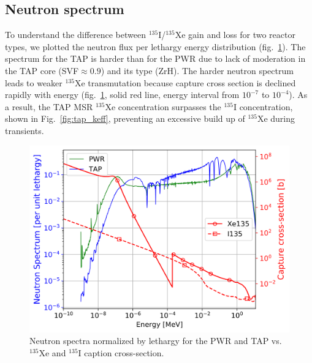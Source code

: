 \documentclass{anstrans}
\begin{document}
\subsection{Neutron spectrum}
To understand the  difference between $^{135}$I/$^{135}$Xe gain and loss for 
two reactor types, we plotted the neutron flux per lethargy energy 
distribution (fig.~\ref{fig:spectrum}). The spectrum for the \gls{TAP} is 
harder than for the \gls{PWR} due to lack of moderation in the \gls{TAP} core 
(\gls{SVF}$\approx0.9$) and its type (ZrH). The harder neutron spectrum leads 
to weaker $^{135}$Xe transmutation because capture cross section is declined 
rapidly with energy (fig.~\ref{fig:spectrum}, solid red line, energy interval 
from $10^{-7}$ to $10^{-4}$). As a result, the \gls{TAP} \gls{MSR} $^{135}$Xe 
concentration surpasses the $^{135}$I concentration, shown in 
Fig.~\ref{fig:tap_keff}, preventing an excessive build up of $^{135}$Xe during 
transients.
\begin{figure}[htbp!] %
        \centering
        \includegraphics[width=1.07\linewidth]{spectra.png}
	        \vspace{-0.2in}
        \caption{Neutron spectra normalized by lethargy for the \gls{PWR} and 
        \gls{TAP} vs. $^{135}$Xe and $^{135}$I 
        caption cross-section.}
        	\vspace{-0.19in}
        \label{fig:spectrum}
\end{figure}
\end{document}
